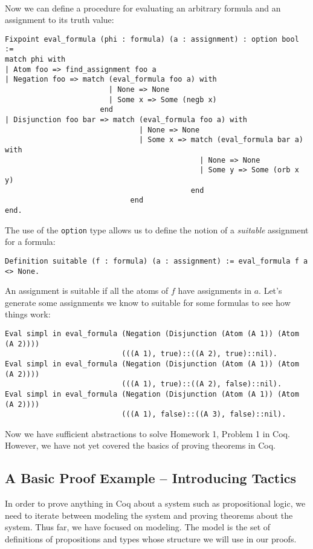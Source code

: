 \documentclass{article}
\begin{document}
\paragraph{}
Now we can define a procedure for evaluating an arbitrary formula and an assignment to its truth value:

\begin{lstlisting}
Fixpoint eval_formula (phi : formula) (a : assignment) : option bool :=
match phi with
| Atom foo => find_assignment foo a
| Negation foo => match (eval_formula foo a) with
                        | None => None
                        | Some x => Some (negb x)
                      end
| Disjunction foo bar => match (eval_formula foo a) with
                               | None => None
                               | Some x => match (eval_formula bar a) with
                                             | None => None
                                             | Some y => Some (orb x y)
                                           end
                             end
end.
\end{lstlisting}

The use of the \verb|option| type allows us to define the notion of a \emph{suitable} assignment for a formula:

\begin{lstlisting}
Definition suitable (f : formula) (a : assignment) := eval_formula f a <> None.
\end{lstlisting}

An assignment is suitable if all the atoms of $f$ have assignments in $a$. Let's generate some assignments we know to suitable for some formulas to see how things work:

\begin{lstlisting}
Eval simpl in eval_formula (Negation (Disjunction (Atom (A 1)) (Atom (A 2))))
                           (((A 1), true)::((A 2), true)::nil).
Eval simpl in eval_formula (Negation (Disjunction (Atom (A 1)) (Atom (A 2))))
                           (((A 1), true)::((A 2), false)::nil).
Eval simpl in eval_formula (Negation (Disjunction (Atom (A 1)) (Atom (A 2))))
                           (((A 1), false)::((A 3), false)::nil).
\end{lstlisting}

Now we have sufficient abstractions to solve Homework 1, Problem 1 in Coq. However, we have not yet covered the basics of proving theorems in Coq. 
\subsection{A Basic Proof Example -- Introducing Tactics} In order to prove anything in Coq about a system such as propositional logic, we need to iterate between modeling the system and proving theorems about the system. Thus far, we have focused on modeling. The model is the set of definitions of propositions and types whose structure we will use in our proofs.
\end{document}
